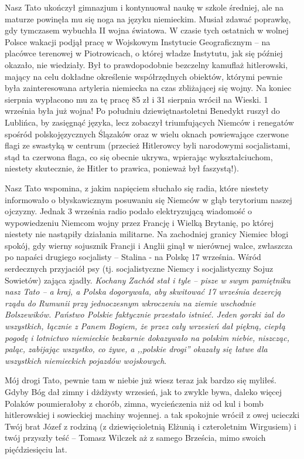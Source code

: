 Nasz Tato ukończył gimnazjum i kontynuował naukę w szkole średniej, ale na maturze powinęła mu się noga na języku niemieckim. Musiał zdawać poprawkę, gdy tymczasem wybuchła II wojna światowa. W czasie tych ostatnich w wolnej Polsce wakacji podjął pracę w Wojskowym Instytucie Geograficznym -- na placówce terenowej w Piotrowicach, o której władze Instytutu, jak się później okazało, nie wiedziały. Był to prawdopodobnie bezczelny kamuflaż hitlerowski, mający na celu dokładne określenie współrzędnych obiektów, którymi pewnie była zainteresowana artyleria niemiecka na czas zbliżającej się wojny. Na koniec sierpnia wypłacono mu za tę pracę 85 zł i 31 sierpnia wrócił na Wieski. 1 września była już wojna! Po południu dziewiętnastoletni Benedykt ruszył do Lublińca, by zasięgnąć języka, lecz zobaczył triumfujących Niemców i renegatów spośród polskojęzycznych Ślązaków oraz w wielu oknach powiewające czerwone flagi ze swastyką w centrum (przecież Hitlerowcy byli narodowymi socjalistami, stąd ta czerwona flaga, co się obecnie ukrywa, wpierając wykształciuchom, niestety skutecznie, że Hitler to prawica, ponieważ był faszystą!).

Nasz Tato wspomina, z jakim napięciem słuchało się radia, które niestety informowało o błyskawicznym posuwaniu się Niemców w głąb terytorium naszej ojczyzny. Jednak 3 września radio podało elektryzującą wiadomość o wypowiedzeniu Niemcom wojny przez Francję i Wielką Brytanię, po której niestety nie nastąpiły działania militarne. Na zachodniej granicy Niemiec błogi spokój, gdy wierny sojusznik Francji i Anglii ginął w nierównej walce, zwłaszcza po napaści drugiego socjalisty – Stalina - na Polskę 17 września. Wśród serdecznych przyjaciół psy (tj. socjalistyczne Niemcy i socjalistyczny Sojuz Sowietów) zająca zjadły. \textit{Kochany Zachód stał i tyle – pisze w swym pamiętniku nasz Tato – a kraj, a Polska dogorywała, aby skwitować 17 września dezercją rządu do Rumunii przy jednoczesnym wkroczeniu na ziemie wschodnie Bolszewików. Państwo Polskie faktycznie przestało istnieć. Jeden gorzki żal do wszystkich, łącznie z Panem Bogiem, że przez cały wrzesień dał piękną, ciepłą pogodę i lotnictwo niemieckie bezkarnie dokazywało na polskim niebie, niszcząc, paląc, zabijając wszystko, co żywe, a ,,polskie drogi'' okazały się łatwe dla wszystkich niemieckich pojazdów wojskowych}. 

Mój drogi Tato, pewnie tam w niebie już wiesz teraz jak bardzo się myliłeś. Gdyby Bóg dał zimny i dżdżysty wrzesień, jak to zwykle bywa, daleko więcej Polaków poumierałoby z chorób, zimna, wycieńczenia niż od kul i bomb hitlerowskiej i sowieckiej machiny wojennej. a tak spokojnie wrócił z owej ucieczki Twój brat Józef z rodziną (z dziewięcioletnią Elżunią i czteroletnim Wirgusiem) i twój przyszły teść -- Tomasz Wilczek aż z samego Brześcia, mimo swoich pięćdziesięciu lat.

